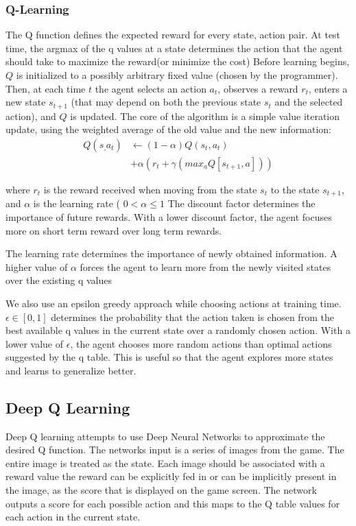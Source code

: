\documentclass[letterpaper, 12 pt, conference]{ieeeconf}
\begin{document}
\subsubsection{Q-Learning} 
The  Q function defines the expected reward for every state, action pair. At test time, the argmax of the q values at a state determines the action that the agent should take to maximize the reward(or minimize the cost)
Before learning begins, $ Q$ is initialized to a possibly arbitrary fixed value (chosen by the programmer). Then, at each time $ t$ the agent selects an action $a_{t}$, observes a reward $r_{t}$, enters a new state $ s_{t+1} $ (that may depend on both the previous state $s_{t}$  and the selected action), and $Q$ is updated. The core of the algorithm is a simple value iteration update, using the weighted average of the old value and the new information:
\begin{align}
    Q(s_, a_t) &\leftarrow (1-\alpha)Q(s_t, a_t) \nonumber\\ 
              &+ \alpha (r_t + \gamma (max_a Q[s_{t+1}, a])) 
\end{align}

where $r_{t}$ is the reward received when moving from the state $ s_{t}$ to the state $s_{t+1}$, and $ \alpha $  is the learning rate ( $0<\alpha \leq 1$
The discount factor determines the importance of future rewards. With a lower discount factor, the agent focuses more on short term reward over long term rewards. 

The learning rate determines the importance of newly obtained information. A higher value of $\alpha$ forces the agent to learn more from the newly visited states over the existing q values

We also use an epsilon greedy approach while choosing actions at training time. $\epsilon \in [0, 1]$ determines the probability that the action taken is chosen from the best available q values in the current state over a randomly chosen action. With a lower value of $\epsilon$, the agent chooses more random actions than optimal actions suggested by the q table. This is useful so that the agent explores more states and learns to generalize better. 

\subsection{Deep Q Learning}
Deep Q learning attempts to use Deep Neural Networks to approximate the desired Q function. The networks input is a series of images from the game. The entire image is treated as the state. Each image should be associated with a reward value the reward can be explicitly fed in or can be implicitly present in the image, as the score that is displayed on the game screen. The network outputs a score for each possible action and this maps to the Q table values for each action in the current state.
\end{document}
